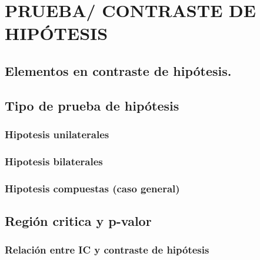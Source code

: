 \documentclass[]{book}
\theoremstyle{definition}
\theoremstyle{definition}
\theoremstyle{definition}
\theoremstyle{remark}
\begin{document}
\hypertarget{hipo}{%
\chapter{PRUEBA/ CONTRASTE DE HIPÓTESIS}\label{hipo}}

\hypertarget{elementos-en-contraste-de-hipuxf3tesis.}{%
\section{Elementos en contraste de hipótesis.}\label{elementos-en-contraste-de-hipuxf3tesis.}}

\hypertarget{tipo-de-prueba-de-hipuxf3tesis}{%
\section{Tipo de prueba de hipótesis}\label{tipo-de-prueba-de-hipuxf3tesis}}

\hypertarget{hipotesis-unilaterales}{%
\subsection{Hipotesis unilaterales}\label{hipotesis-unilaterales}}

\hypertarget{hipotesis-bilaterales}{%
\subsection{Hipotesis bilaterales}\label{hipotesis-bilaterales}}

\hypertarget{hipotesis-compuestas-caso-general}{%
\subsection{Hipotesis compuestas (caso general)}\label{hipotesis-compuestas-caso-general}}

\hypertarget{regiuxf3n-critica-y-p-valor}{%
\section{Región critica y p-valor}\label{regiuxf3n-critica-y-p-valor}}

\hypertarget{relaciuxf3n-entre-ic-y-contraste-de-hipuxf3tesis}{%
\subsection{Relación entre IC y contraste de hipótesis}\label{relaciuxf3n-entre-ic-y-contraste-de-hipuxf3tesis}}
\end{document}
